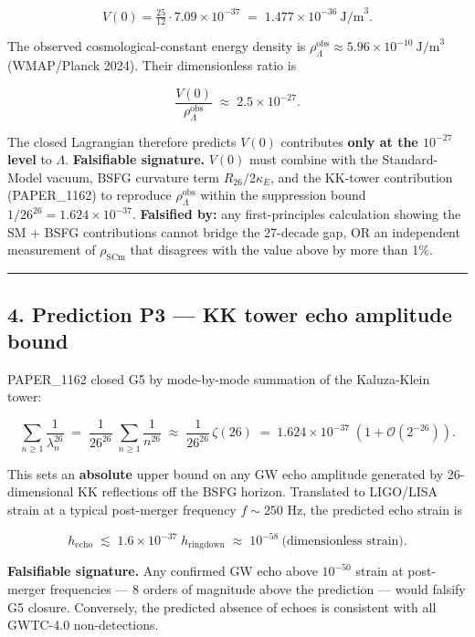 \documentclass[
]{article}
\begin{document}
\[
V(0) = \tfrac{25}{12}\cdot 7.09\times10^{-37}
\;=\; 1.477\times10^{-36}\ \text{J/m}^{3}.
\]

The observed cosmological-constant energy density is
\(\rho_{\Lambda}^{\text{obs}} \approx 5.96\times10^{-10}\ \text{J/m}^{3}\)
(WMAP/Planck 2024). Their dimensionless ratio is

\[
\frac{V(0)}{\rho_{\Lambda}^{\text{obs}}}\;\approx\; 2.5\times10^{-27}.
\]

The closed Lagrangian therefore predicts \(V(0)\) contributes
\textbf{only at the \(10^{-27}\) level} to \(\Lambda\).
\textbf{Falsifiable signature.} \(V(0)\) must combine with the
Standard-Model vacuum, BSFG curvature term \(R_{26}/2\kappa_E\), and the
KK-tower contribution (PAPER\_1162) to reproduce
\(\rho_{\Lambda}^{\text{obs}}\) within the suppression bound
\(1/26^{26} = 1.624\times10^{-37}\). \textbf{Falsified by:} any
first-principles calculation showing the SM + BSFG contributions cannot
bridge the 27-decade gap, OR an independent measurement of
\(\rho_{\mathrm{SCm}}\) that disagrees with the value above by more than
1\%.

\begin{center}\rule{0.5\linewidth}{0.5pt}\end{center}

\subsection{4. Prediction P3 --- KK tower echo amplitude
bound}\label{prediction-p3-kk-tower-echo-amplitude-bound}

PAPER\_1162 closed G5 by mode-by-mode summation of the Kaluza-Klein
tower:

\[
\sum_{n\ge 1}\frac{1}{\lambda_{n}^{26}}\;=\;\frac{1}{26^{26}}\;\sum_{n\ge 1}\frac{1}{n^{26}}
\;\approx\;\frac{1}{26^{26}}\,\zeta(26)
\;=\;1.624\times10^{-37}\;(1+\mathcal{O}(2^{-26})).
\]

This sets an \textbf{absolute} upper bound on any GW echo amplitude
generated by 26-dimensional KK reflections off the BSFG horizon.
Translated to LIGO/LISA strain at a typical post-merger frequency
\(f \sim 250\) Hz, the predicted echo strain is

\[
h_{\text{echo}}\;\lesssim\;1.6\times10^{-37}\;h_{\text{ringdown}}
\;\approx\;10^{-58}\ \text{(dimensionless strain)}.
\]

\textbf{Falsifiable signature.} Any confirmed GW echo above \(10^{-50}\)
strain at post-merger frequencies --- 8 orders of magnitude above the
prediction --- would falsify G5 closure. Conversely, the predicted
absence of echoes is consistent with all GWTC-4.0 non-detections.
\end{document}
